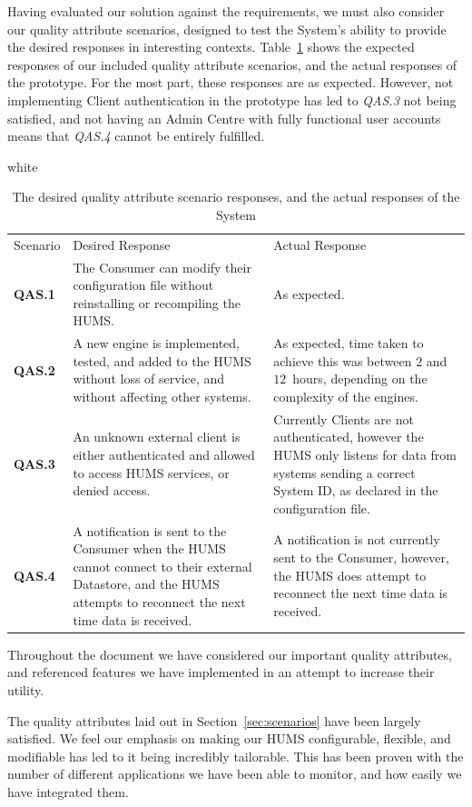 \documentclass[10pt,a4paper]{article}
\newcommand{\tableformat}[4]{
\begin{table}[ht!]
\centering
  \rowcolors{2}{gray!10} {white}
\def\arraystretch{1.5}
\begin{tabularx}{\textwidth}{#1}
  \hline
  \rowcolor[gray]{0.9} #2
  \hline
\end{tabularx}
\caption{#3}
\label{#4}
\end{table}}
\newcommand{\qas}[1]{\textcolor{reqColor}{\textbf{QAS.#1}}}
\begin{document}
Having evaluated our solution against the requirements, we must also consider our quality attribute scenarios, designed to test the System's ability to provide the desired responses in interesting contexts. Table~\ref{tab:qasEval} shows the expected responses of our included quality attribute scenarios, and the actual responses of the prototype. For the most part, these responses are as expected. However, not implementing Client authentication in the prototype has led to \emph{QAS.3} not being satisfied, and not having an Admin Centre with fully functional user accounts means that \emph{QAS.4} cannot be entirely fulfilled.


\tableformat{ p{2cm} X X }{
Scenario & Desired Response & Actual Response \\
\qas{1} & The Consumer can modify their configuration file without reinstalling or recompiling the HUMS. & As expected.\\
\qas{2} & A new engine is implemented, tested, and added to the HUMS without loss of service, and without affecting other systems. & As expected, time taken to achieve this was between $2$ and $12$~hours, depending on the complexity of the engines. \\
\qas{3} & An unknown external client is either authenticated and allowed to access HUMS services, or denied access. & Currently Clients are not authenticated, however the HUMS only listens for data from systems sending a correct System ID, as declared in the configuration file. \\
\qas{4} & A notification is sent to the Consumer when the HUMS cannot connect to their external Datastore, and the HUMS attempts to reconnect the next time data is received. & A notification is not currently sent to the Consumer, however, the HUMS does attempt to reconnect the next time data is received.\\
}{The desired quality attribute scenario responses, and the actual responses of the System}{tab:qasEval}

Throughout the document we have considered our important quality attributes, and referenced features we have implemented in an attempt to increase their utility.

The quality attributes laid out in Section~\ref{sec:scenarios} have been largely satisfied. We feel our emphasis on making our HUMS configurable, flexible, and modifiable has led to it being incredibly tailorable. This has been proven with the number of different applications we have been able to monitor, and how easily we have integrated them.
\end{document}
